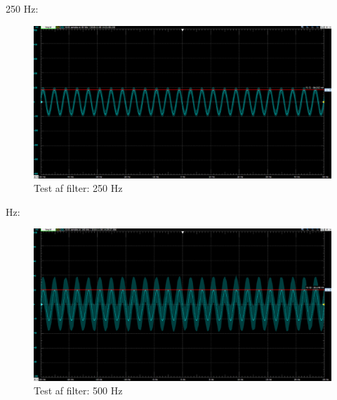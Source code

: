 250 Hz:
\begin{figure}[h!]
	\centering
	\includegraphics[width=1\linewidth]{Hardwaredesign/250hz}
	\caption{Test af filter: 250 Hz}
	\label{fig:250hz}
\end{figure}
 Hz:
\begin{figure}[h!]
	\centering
	\includegraphics[width=1\linewidth]{Hardwaredesign/500hz}
	\caption{Test af filter: 500 Hz}
	\label{fig:500hz}
\end{figure}


